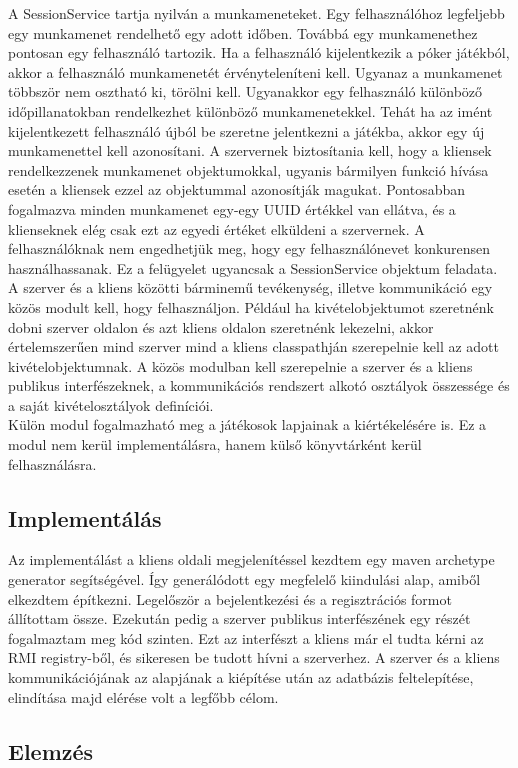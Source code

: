 A SessionService tartja nyilván a munkameneteket. Egy felhasználóhoz legfeljebb egy munkamenet rendelhető egy adott időben. Továbbá egy munkamenethez pontosan egy felhasználó tartozik. Ha a felhasználó kijelentkezik a póker játékból, akkor a felhasználó munkamenetét érvényteleníteni kell. Ugyanaz a munkamenet többször nem osztható ki, törölni kell. Ugyanakkor egy felhasználó különböző időpillanatokban rendelkezhet különböző munkamenetekkel. Tehát ha az imént kijelentkezett felhasználó újból be szeretne jelentkezni a játékba, akkor egy új munkamenettel kell azonosítani. A szervernek biztosítania kell, hogy a kliensek rendelkezzenek munkamenet objektumokkal, ugyanis bármilyen funkció hívása esetén a kliensek ezzel az objektummal azonosítják magukat. Pontosabban fogalmazva minden munkamenet egy-egy UUID értékkel van ellátva, és a klienseknek elég csak ezt az egyedi értéket elküldeni a szervernek. A felhasználóknak nem engedhetjük meg, hogy egy felhasználónevet konkurensen használhassanak. Ez a felügyelet ugyancsak a SessionService objektum feladata. \\
A szerver és a kliens közötti bárminemű tevékenység, illetve kommunikáció egy közös modult kell, hogy felhasználjon. Például ha kivételobjektumot szeretnénk dobni szerver oldalon és azt kliens oldalon szeretnénk lekezelni, akkor értelemszerűen mind szerver mind a kliens classpathján szerepelnie kell az adott kivételobjektumnak. A közös modulban kell szerepelnie a szerver és a kliens publikus interfészeknek, a kommunikációs rendszert alkotó osztályok összessége és a saját kivételosztályok definíciói. \\
Külön modul fogalmazható meg a játékosok lapjainak a kiértékelésére is. Ez a modul nem kerül implementálásra, hanem külső könyvtárként kerül felhasználásra.
\subsection{Implementálás}
Az implementálást a kliens oldali megjelenítéssel kezdtem egy maven archetype generator segítségével. Így generálódott egy megfelelő kiindulási alap, amiből elkezdtem építkezni. Legelőször a bejelentkezési és a regisztrációs formot állítottam össze. Ezekután pedig a szerver publikus interfészének egy részét fogalmaztam meg kód szinten. Ezt az interfészt a kliens már el tudta kérni az RMI registry-ből, és sikeresen be tudott hívni a szerverhez. A szerver és a kliens kommunikációjának az alapjának a kiépítése után az adatbázis feltelepítése, elindítása majd elérése volt a legfőbb célom. 
\subsection{Elemzés}

